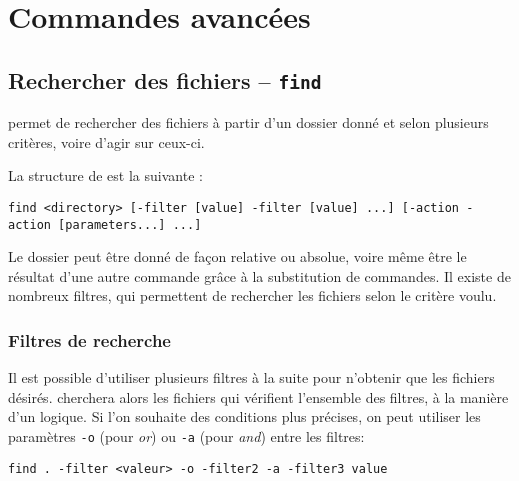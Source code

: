 \section{Commandes avancées}

\subsection{Rechercher des fichiers -- \texttt{find}} 
 permet de rechercher des fichiers à partir d'un dossier donné et selon plusieurs critères, voire d'agir sur ceux-ci.

La structure de  est la suivante : 
\begin{nscenter}
\texttt{find <directory> [-filter [value] -filter [value] ...] [-action -action [parameters...] ...]}
\end{nscenter}
Le dossier peut être donné de façon relative ou absolue, voire même être le résultat d'une autre commande grâce à la substitution de commandes. Il existe de nombreux filtres, qui permettent de rechercher les fichiers selon le critère voulu.

\subsubsection{Filtres de recherche}
Il est possible d'utiliser plusieurs filtres à la suite pour n'obtenir que les fichiers désirés.  cherchera alors les fichiers qui vérifient l'ensemble des filtres, à la manière d'un  logique.
Si l'on souhaite des conditions plus précises, on peut utiliser les paramètres \texttt{-o} (pour \textit{or}) ou \texttt{-a} (pour \textit{and}) entre les filtres:
\begin{nscenter}
\texttt{find . -filter <valeur> -o -filter2 -a -filter3 value}
\end{nscenter}

